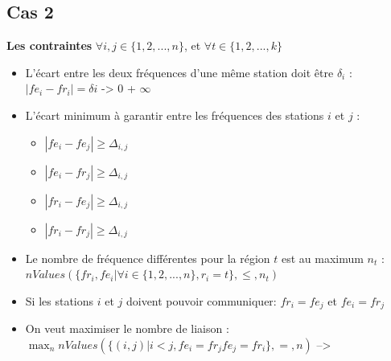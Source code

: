 \documentclass[a4paper, 10pt]{article}
\begin{document}
  \subsection{Cas 2 }

    \textbf{Les contraintes} $\forall i,j \in \{1,2,...,n \}$, et $\forall t \in \{1,2,...,k\}$
    \begin{itemize}
      \item L'écart entre les deux fréquences d'une même station doit être $\delta_{i}$ :
       $| fe_{i} - fr_{i} | = \delta{i}$ -> \color{green} 0 \color{red} + $\infty$ \color{black}
      \item L'écart minimum à garantir entre les fréquences des stations $i$ et $j$ :
      \begin{itemize}
        \item $| fe_i - fe_j | \geq \Delta_{i,j}$
        \item $| fe_i - fr_j | \geq \Delta_{i,j}$
        \item $| fr_i - fe_j | \geq \Delta_{i,j}$
        \item $| fr_i - fr_j | \geq \Delta_{i,j}$
      \end{itemize}
      \item Le nombre de fréquence différentes pour la région $t$ est au maximum $n_t$ : $nValues(\{fr_{i}, fe_{i} | \forall i \in \{1,2,...,n \}, r_{i} = t \}, \leq, n_{t})$
      \item Si les stations $i$ et $j$ doivent pouvoir communiquer:
      $fr_i = fe_j$ et $fe_i = fr_j$
      \item On veut maximiser le nombre de liaison :  $\displaystyle{ \max_{n} nValues(\{ (i,j) | i<j, fe_i = fr_j fe_j = fr_i \}, =,n)}$ -->
  \end{itemize}
\end{document}
